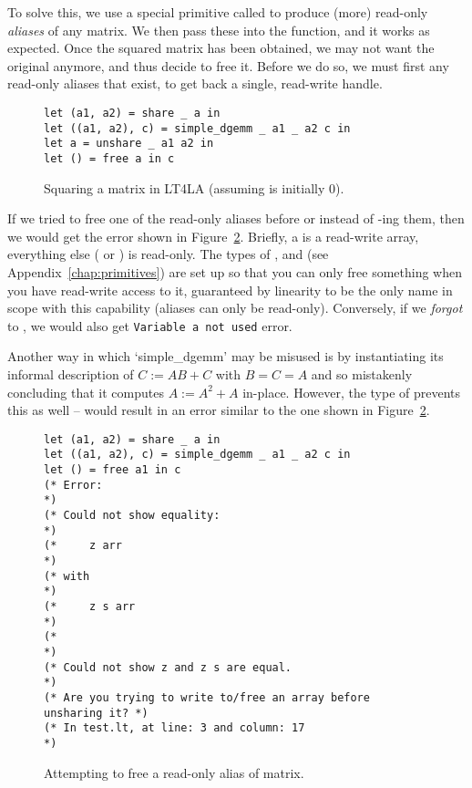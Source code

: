 To solve this, we use a special primitive called  to produce
(more) read-only \emph{aliases} of any matrix. We then pass these into the
function, and it works as expected. Once the squared matrix has been obtained,
we may not want the original anymore, and thus decide to free it. Before we do
so, we must first  any read-only aliases that exist, to get back
a single, read-write handle.

\begin{figure}[tp]
    \centering
    \begin{verbatim}
let (a1, a2) = share _ a in
let ((a1, a2), c) = simple_dgemm _ a1 _ a2 c in
let a = unshare _ a1 a2 in
let () = free a in c
    \end{verbatim}
    \caption{Squaring a matrix in LT4LA (assuming  is initially
        0).}\label{fig:ltfla_square}
\end{figure}

If we tried to free one of the read-only aliases before or instead of
-ing them, then we would get the error shown in
Figure~\ref{fig:ltfla_free}. Briefly, a  is a read-write array,
everything else ( or ) is read-only. The types of
,  and  (see
Appendix~\ref{chap:primitives}) are set up so that you can only free something
when you have read-write access to it, guaranteed by linearity to be the only
name in scope with this capability (aliases can only be read-only). Conversely,
if we \emph{forgot} to , we would also get \texttt{Variable a not
used} error.

Another way in which `simple\_dgemm' may be misused is by instantiating its
informal description of $C := AB + C$ with $B = C = A$ and so mistakenly
concluding that it computes $A := A^2 + A$ in-place. However, the type of
 prevents this as well --  would result in an error similar to the one shown
in Figure~\ref{fig:ltfla_free}.

\begin{figure}[tp]
    \centering
    \begin{verbatim}
let (a1, a2) = share _ a in
let ((a1, a2), c) = simple_dgemm _ a1 _ a2 c in
let () = free a1 in c
(* Error:                                                        *)
(* Could not show equality:                                      *)
(*     z arr                                                     *)
(* with                                                          *)
(*     z s arr                                                   *)
(*                                                               *)
(* Could not show z and z s are equal.                           *)
(* Are you trying to write to/free an array before unsharing it? *)
(* In test.lt, at line: 3 and column: 17                         *)
    \end{verbatim}
    \caption{Attempting to free a read-only alias of matrix.}\label{fig:ltfla_free}
\end{figure}


